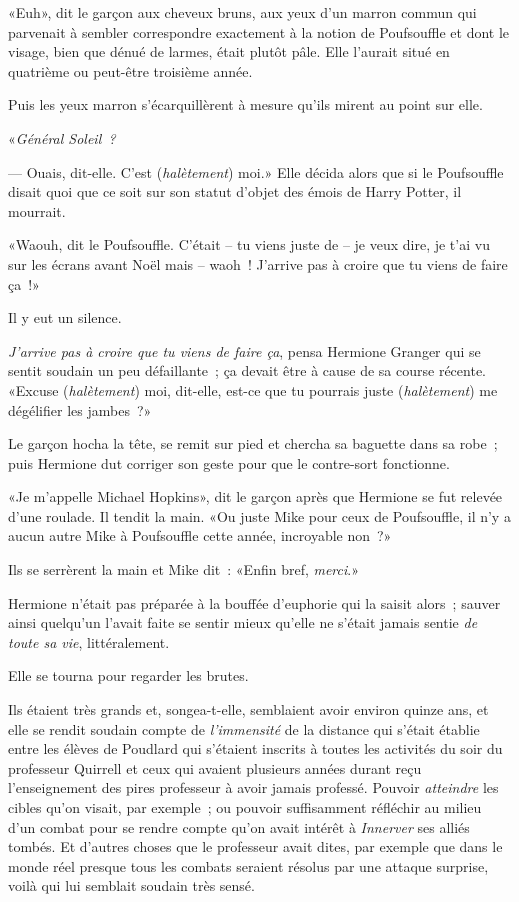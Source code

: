 «Euh», dit le garçon aux cheveux bruns, aux yeux d'un marron commun qui parvenait à sembler correspondre exactement à la notion de Poufsouffle et dont le visage, bien que dénué de larmes, était plutôt pâle. Elle l'aurait situé en quatrième ou peut-être troisième année.

Puis les yeux marron s'écarquillèrent à mesure qu'ils mirent au point sur elle.

«\emph{Général Soleil~?}

--- Ouais, dit-elle. C'est (\emph{halètement}) moi.» Elle décida alors que si le Poufsouffle disait quoi que ce soit sur son statut d'objet des émois de Harry Potter, il mourrait.

«Waouh, dit le Poufsouffle. C'était -- tu viens juste de -- je veux dire, je t'ai vu sur les écrans avant Noël mais -- waoh~! J'arrive pas à croire que tu viens de faire ça~!»

Il y eut un silence.

\emph{J'arrive pas à croire que tu viens de faire ça}, pensa Hermione Granger qui se sentit soudain un peu défaillante~; ça devait être à cause de sa course récente. «Excuse (\emph{halètement}) moi, dit-elle, est-ce que tu pourrais juste (\emph{halètement}) me dégélifier les jambes~?»

Le garçon hocha la tête, se remit sur pied et chercha sa baguette dans sa robe~; puis Hermione dut corriger son geste pour que le contre-sort fonctionne.

«Je m'appelle Michael Hopkins», dit le garçon après que Hermione se fut relevée d'une roulade. Il tendit la main. «Ou juste Mike pour ceux de Poufsouffle, il n'y a aucun autre Mike à Poufsouffle cette année, incroyable non~?»

Ils se serrèrent la main et Mike dit~: «Enfin bref, \emph{merci}.»

Hermione n'était pas préparée à la bouffée d'euphorie qui la saisit alors~; sauver ainsi quelqu'un l'avait faite se sentir mieux qu'elle ne s'était jamais sentie \emph{de toute sa vie}, littéralement.

Elle se tourna pour regarder les brutes.

Ils étaient très grands et, songea-t-elle, semblaient avoir environ quinze ans, et elle se rendit soudain compte de \emph{l'immensité} de la distance qui s'était établie entre les élèves de Poudlard qui s'étaient inscrits à toutes les activités du soir du professeur Quirrell et ceux qui avaient plusieurs années durant reçu l'enseignement des pires professeur à avoir jamais professé. Pouvoir \emph{atteindre} les cibles qu'on visait, par exemple~; ou pouvoir suffisamment réfléchir au milieu d'un combat pour se rendre compte qu'on avait intérêt à \emph{Innerver} ses alliés tombés. Et d'autres choses que le professeur avait dites, par exemple que dans le monde réel presque tous les combats seraient résolus par une attaque surprise, voilà qui lui semblait soudain très sensé.

